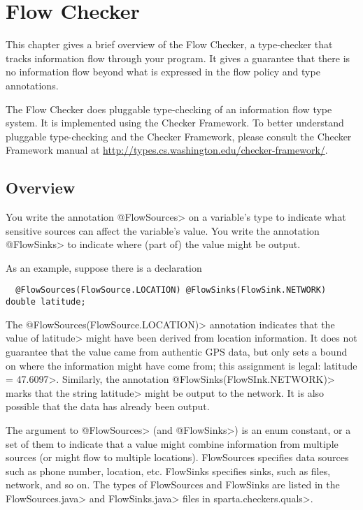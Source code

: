 \htmlhr
\chapter{Flow Checker\label{flow-checker}}

This chapter gives a brief overview of the Flow Checker, a type-checker that 
tracks information flow through your program.  It gives a guarantee that there
 is no information flow beyond what is expressed in the flow policy and type annotations.

The Flow Checker does pluggable type-checking of an information flow type
system.  It is implemented using the Checker Framework.  To better
understand pluggable type-checking and the Checker Framework, please
consult the Checker Framework manual at
\url{http://types.cs.washington.edu/checker-framework/}.  

\section{Overview}

You write the annotation \<@FlowSources> on a variable's
type to indicate what sensitive sources can affect the variable's value.
You write the annotation \<@FlowSinks> to indicate where (part of) the
value might be output.

As an example, suppose there is a declaration
\begin{Verbatim}
  @FlowSources(FlowSource.LOCATION) @FlowSinks(FlowSink.NETWORK) double latitude;
\end{Verbatim}
\noindent
The \<@FlowSources(FlowSource.LOCATION)> annotation indicates that the value of \<latitude> might have been derived from
location information.  It does not guarantee that the value came from
authentic GPS data, but only sets a bound on where the information might
have come from; this assignment is legal: \<latitude = 47.6097>.
Similarly, the annotation \<@FlowSinks(FlowSInk.NETWORK)> marks that the string \<latitude> 
might be output to the network.  It is also possible that the data has already been output.

The argument to \<@FlowSources> (and \<@FlowSinks>) is an enum constant, or a
set of them to indicate that a value might combine information from
multiple sources (or might flow to multiple locations).
FlowSources specifies data sources such as phone number, location, 
etc.  FlowSinks specifies sinks, such as files, network, and so on.
The types of FlowSources and FlowSinks are listed in the
\<FlowSources.java> and \<FlowSinks.java> files in \<sparta.checkers.quals>.






